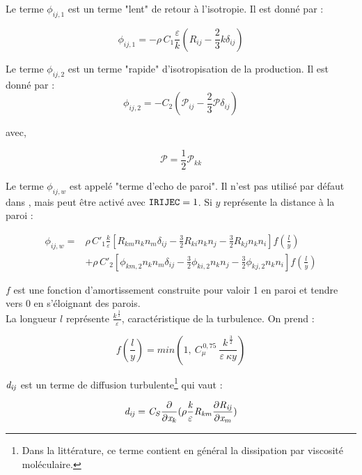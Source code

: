 Le terme $\phi_{ij,1}$ est un terme "lent" de retour \`a l'isotropie. Il est donn\'e par :

\begin{equation}
\displaystyle
\phi_{ij,1} = -\rho\,C_1 \frac{\varepsilon}{k} (R_{ij} - \frac{2}{3} k \delta_{ij})
\end{equation}

Le terme $\phi_{ij,2}$ est un terme "rapide" d'isotropisation de la production. Il est donn\'e par :
\begin{equation}
\displaystyle
\phi_{ij,2} = -C_2 (\mathcal{P}_{ij} - \frac{2}{3} \mathcal{P} \delta_{ij})
\end{equation}

avec,

$$\displaystyle \mathcal{P} = \frac{1}{2} \mathcal{P}_{kk}$$

Le terme $\phi_{ij,w}$ est appel\'e "terme d'echo de paroi". Il n'est pas
utilis\'e par d\'efaut dans \CS, mais peut \^etre activ\'e avec $\text{\texttt{IRIJEC}} = 1$. Si $y$ repr\'esente la distance \`a la paroi :

\begin{equation}
\begin{array} {ll}
\displaystyle
\phi_{ij,w}  = &
\displaystyle \rho\,C'_1 \frac{k}{\varepsilon} \left[ R_{km} n_k n_m \delta_{ij} -
\frac{3}{2} R_{ki} n_k n_j -
\frac{3}{2} R_{kj} n_k n_i \right] f(\frac{l}{y})  \\
&
+\displaystyle \rho\,C'_2 \left[ \phi_{km,2} n_k n_m \delta_{ij} -
\frac{3}{2} \phi_{ki,2} n_k n_j -
\frac{3}{2} \phi_{kj,2} n_k n_i \right] f(\frac{l}{y})
\end{array}
\end{equation}

$f$ est une fonction d'amortissement construite pour valoir 1 en paroi et tendre
vers 0 en s'\'eloignant des parois.\\
La longueur $l$ repr\'esente
$\displaystyle\frac{k^{\,\frac{3}{2}}}{\varepsilon}$, caract\'eristique de la turbulence. On prend :

\begin{equation}
f(\frac{l}{y}) = min(1, \ C^{\,0,75}_{\mu} \
\frac{k^{\,\frac{3}{2}}}{\varepsilon\ \kappa y})
\end{equation}


$\it{d}_{ij}$ est un terme de diffusion turbulente\footnote{Dans la litt\'erature, ce terme contient en g\'en\'eral la dissipation par viscosit\'e mol\'eculaire.} qui vaut :

\begin{equation}
\it{d}_{ij} = C_{S} \frac{\partial}{\partial x_k} (\rho \frac{k}{\varepsilon} R_{km} \frac{\partial R_{ij}}{\partial x_m})
\end{equation}


